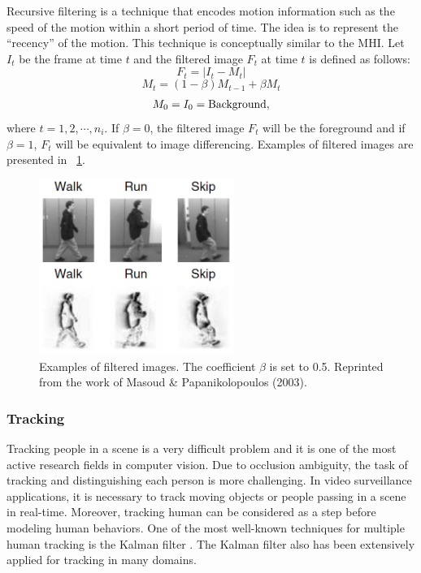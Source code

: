Recursive filtering  is a technique
that encodes motion information such as the speed of the motion within
a short period of time. The idea is to represent the ``recency'' of the
motion. This technique is conceptually similar to the MHI. Let $I_t$
be the frame at time $t$ and the filtered image $F_t$ at time $t$ is
defined as follows:
\[
  F_t = \left| {I_t  - M_t } \right|
\]
\[
  M_t = (1 - \beta)M_{t - 1}  + \beta M_t 
\]
\[
  M_0 = I_0 = {\rm Background},
\]
where $t = 1, 2, \cdots, n_i$. If $\beta = 0$, the filtered image
$F_t$ will be the foreground and if $\beta = 1$, $F_t$ will be
equivalent to image differencing. Examples of filtered images are
presented in \figurename~\ref{fig:f-img}.

\begin{figure}[t]
  \centering
  \includegraphics[width=2.5in]{figures/f-img}
  \caption[Examples of filtered images]{Examples of filtered
  images. The coefficient $\beta$ is set to 0.5. Reprinted from the
  work of Masoud \& Papanikolopoulos (2003).}
  \label{fig:f-img}
\end{figure}

\subsubsection{Tracking} 

Tracking people in a scene is a very difficult problem and it is one
of the most active research fields in computer vision. Due to
occlusion ambiguity, the task of tracking and distinguishing each
person is more challenging. In video surveillance applications, it is
necessary to track moving objects or people passing in a scene in
real-time. Moreover, tracking human can be considered as a step before
modeling human behaviors. One of the most well-known techniques for
multiple human tracking is the Kalman
filter . The Kalman filter also has been
extensively applied for tracking in many domains.

